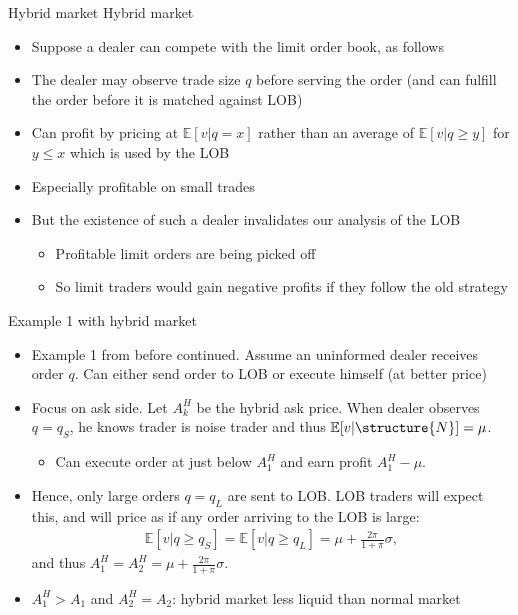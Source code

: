 \documentclass[english,10pt
,aspectratio=169
]{beamer}
\begin{document}
\begin{frame}{Hybrid market}
	Hybrid market
	\begin{itemize}
		\item Suppose a dealer can compete with the limit order book, as follows
		\item The dealer may observe trade size $q$ before serving the order (and can fulfill the order before it is matched against LOB)
		\item Can profit by pricing at $\mathbb{E}[v|q=x]$ rather than an average of $\mathbb{E}[v|q \geq y]$ for $y \leq x$ which is used by the LOB
		\item Especially profitable on small trades
		\item But the existence of such a dealer invalidates our analysis of the LOB
		\begin{itemize}
			\item Profitable limit orders are being picked off
			\item So limit traders would gain negative profits if they follow the old strategy
		\end{itemize}
	\end{itemize}
\end{frame}


\begin{frame}{Example 1 with hybrid market}
	\begin{itemize}
		\item Example 1 from before continued. Assume an uninformed dealer receives order $q$. Can either send order to LOB or execute himself (at better price) 
		\pause
		\item Focus on ask side. Let $A^H_k$ be the hybrid ask price. When dealer observes $q=q_S$, he knows trader is noise trader and thus $\mathbb{E}[v|\structure{N}]=\mu$. 
		\begin{itemize}
			\item Can execute order at just below $A^H_1$ and earn profit $A^H_1-\mu$.
		\end{itemize}
		\pause
		\item Hence, only large orders $q=q_L$ are sent to LOB. LOB traders will expect this, and will price as if any order arriving to the LOB is large:
		\begin{align*}
			\mathbb{E}[v|q \ge q_S]=\mathbb{E}[v|q \ge q_L]=\mu+\frac{2\pi}{1+\pi} \sigma,
		\end{align*}
		and thus $A^H_1=A^H_2=\mu+\frac{2\pi}{1+\pi} \sigma$.
		\item $A^H_1>A_1$ and $A^H_2=A_2$: hybrid market less liquid than normal market
	\end{itemize}
\end{frame}
\end{document}
